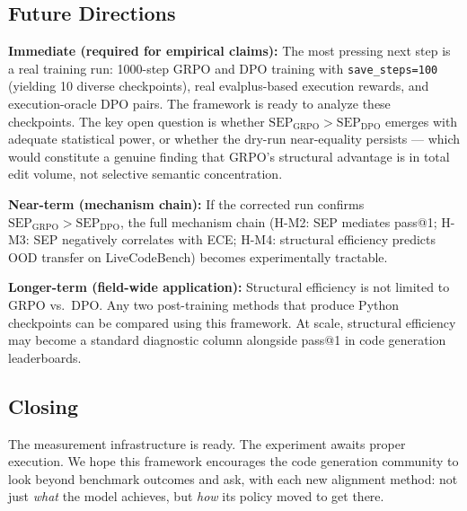 \subsection{Future Directions}
\label{sec:future}

\textbf{Immediate (required for empirical claims):}
The most pressing next step is a real training run: 1000-step GRPO and DPO
training with \texttt{save\_steps=100} (yielding 10 diverse checkpoints), real
evalplus-based execution rewards, and execution-oracle DPO pairs. The framework
is ready to analyze these checkpoints. The key open question is whether
$\text{SEP}_\text{GRPO} > \text{SEP}_\text{DPO}$ emerges with adequate statistical power,
or whether the dry-run near-equality persists --- which would constitute a genuine finding
that GRPO's structural advantage is in total edit volume, not selective
semantic concentration.

\textbf{Near-term (mechanism chain):}
If the corrected run confirms $\text{SEP}_\text{GRPO} > \text{SEP}_\text{DPO}$, the full mechanism chain
(H-M2: SEP mediates pass@1; H-M3: SEP negatively correlates with ECE;
H-M4: structural efficiency predicts OOD transfer on LiveCodeBench) becomes
experimentally tractable.

\textbf{Longer-term (field-wide application):}
Structural efficiency is not limited to GRPO vs.\ DPO. Any two post-training
methods that produce Python checkpoints can be compared using this framework.
At scale, structural efficiency may become a standard diagnostic column alongside
pass@1 in code generation leaderboards.

\subsection{Closing}

The measurement infrastructure is ready. The experiment awaits proper execution.
We hope this framework encourages the code generation community to look beyond
benchmark outcomes and ask, with each new alignment method: not just \emph{what} the
model achieves, but \emph{how} its policy moved to get there.
